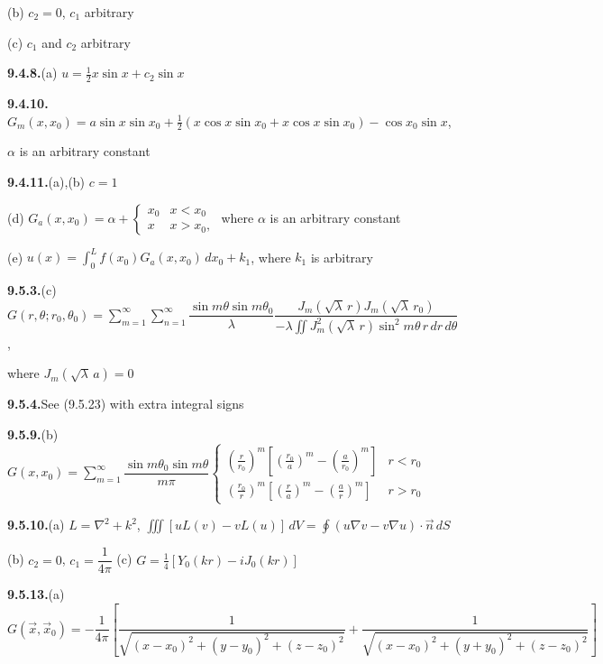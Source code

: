 \quad (b) $c_2 = 0$, $c_1$ arbitrary

\quad (c) $c_1$ and $c_2$ arbitrary

\medskip
\textbf{9.4.8.}\quad (a) $u = \frac{1}{2}x\sin x + c_2\sin x$

\medskip
\textbf{9.4.10.}\quad $G_m(x,x_0) = a\sin x\sin x_0 + \frac{1}{2}(x\cos x\sin x_0 + x\cos x\sin x_0) - \cos x_0\sin x$,

$\alpha$ is an arbitrary constant

\medskip
\textbf{9.4.11.}\quad (a),(b) $c = 1$

\quad (d) $G_a(x,x_0) = \alpha + \begin{cases} x_0 & x < x_0 \\ x & x > x_0, \end{cases}$ where $\alpha$ is an arbitrary constant

\quad (e) $u(x) = \int_0^L f(x_0)G_a(x,x_0)\,dx_0 + k_1$, where $k_1$ is arbitrary

\medskip
\textbf{9.5.3.}\quad (c) $G(r,\theta;r_0,\theta_0) = \sum_{m=1}^{\infty}\sum_{n=1}^{\infty}\dfrac{\sin m\theta\sin m\theta_0}{\lambda}\dfrac{J_m(\sqrt{\lambda}\,r)J_m(\sqrt{\lambda}\,r_0)}{-\lambda\iint J_m^2(\sqrt{\lambda}\,r)\sin^2 m\theta\,r\,dr\,d\theta}$,

where $J_m(\sqrt{\lambda}\,a) = 0$

\medskip
\textbf{9.5.4.}\quad See (9.5.23) with extra integral signs

\medskip
\textbf{9.5.9.}\quad (b) $G(x,x_0) = \sum_{m=1}^{\infty}\dfrac{\sin m\theta_0\sin m\theta}{m\pi}\left\{\begin{array}{ll}\left(\frac{r}{r_0}\right)^m\left[\left(\frac{r_0}{a}\right)^m-\left(\frac{a}{r_0}\right)^m\right] & r < r_0\\[6pt] \left(\frac{r_0}{r}\right)^m\left[\left(\frac{r}{a}\right)^m-\left(\frac{a}{r}\right)^m\right] & r > r_0\end{array}\right.$%

\medskip
\textbf{9.5.10.}\quad (a) $L = \nabla^2 + k^2$, $\iiint[uL(v)-vL(u)]\,dV = \oint(u\nabla v - v\nabla u)\cdot\vec{n}\,dS$

\quad (b) $c_2 = 0$, $c_1 = \dfrac{1}{4\pi}$ \qquad (c) $G = \frac{1}{4}\left[Y_0(kr) - iJ_0(kr)\right]$

\medskip
\textbf{9.5.13.}\quad (a) $G(\vec{x},\vec{x}_0) = -\dfrac{1}{4\pi}\left[\dfrac{1}{\sqrt{(x-x_0)^2+(y-y_0)^2+(z-z_0)^2}} + \dfrac{1}{\sqrt{(x-x_0)^2+(y+y_0)^2+(z-z_0)^2}}\right]$%

